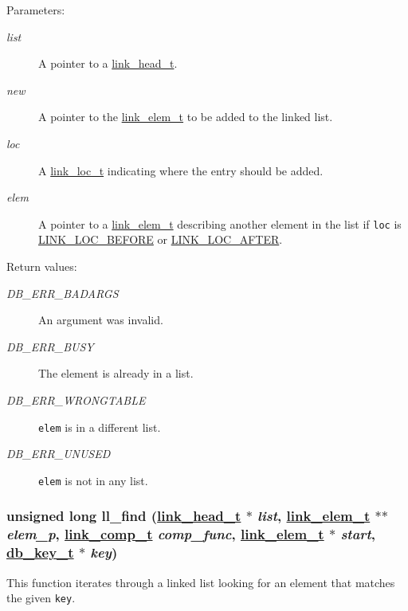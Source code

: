 \begin{Desc}
\item[Parameters:]
\begin{description}
\item[{\em list}]A pointer to a \hyperlink{group__dbprim__link_a0}{link\_\-head\_\-t}. \item[{\em new}]A pointer to the \hyperlink{group__dbprim__link_a1}{link\_\-elem\_\-t} to be added to the linked list. \item[{\em loc}]A \hyperlink{group__dbprim__link_a4}{link\_\-loc\_\-t} indicating where the entry should be added. \item[{\em elem}]A pointer to a \hyperlink{group__dbprim__link_a1}{link\_\-elem\_\-t} describing another element in the list if {\tt loc} is \hyperlink{group__dbprim__link_a26a133}{LINK\_\-LOC\_\-BEFORE} or \hyperlink{group__dbprim__link_a26a134}{LINK\_\-LOC\_\-AFTER}.\end{description}
\end{Desc}
\begin{Desc}
\item[Return values:]
\begin{description}
\item[{\em DB\_\-ERR\_\-BADARGS}]An argument was invalid. \item[{\em DB\_\-ERR\_\-BUSY}]The element is already in a list. \item[{\em DB\_\-ERR\_\-WRONGTABLE}]{\tt elem} is in a different list. \item[{\em DB\_\-ERR\_\-UNUSED}]{\tt elem} is not in any list. \end{description}
\end{Desc}
\hypertarget{group__dbprim__link_a9}{
\subsubsection[ll\_\-find]{\setlength{\rightskip}{0pt plus 5cm}unsigned long ll\_\-find (\hyperlink{dbprim_8h_a0}{link\_\-head\_\-t} $\ast$ {\em list}, \hyperlink{dbprim_8h_a1}{link\_\-elem\_\-t} $\ast$$\ast$ {\em elem\_\-p}, \hyperlink{dbprim_8h_a3}{link\_\-comp\_\-t} {\em comp\_\-func}, \hyperlink{dbprim_8h_a1}{link\_\-elem\_\-t} $\ast$ {\em start}, \hyperlink{dbprim_8h_a0}{db\_\-key\_\-t} $\ast$ {\em key})}}
\label{group__dbprim__link_a9}


This function iterates through a linked list looking for an element that matches the given {\tt key}.

